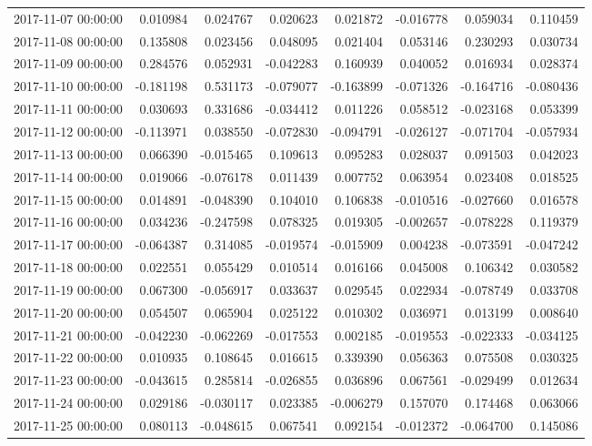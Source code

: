 \begin{tabular}{lrrrrrrr}
2017-11-07 00:00:00 & 0.010984 & 0.024767 & 0.020623 & 0.021872 & -0.016778 & 0.059034 & 0.110459 \\
2017-11-08 00:00:00 & 0.135808 & 0.023456 & 0.048095 & 0.021404 & 0.053146 & 0.230293 & 0.030734 \\
2017-11-09 00:00:00 & 0.284576 & 0.052931 & -0.042283 & 0.160939 & 0.040052 & 0.016934 & 0.028374 \\
2017-11-10 00:00:00 & -0.181198 & 0.531173 & -0.079077 & -0.163899 & -0.071326 & -0.164716 & -0.080436 \\
2017-11-11 00:00:00 & 0.030693 & 0.331686 & -0.034412 & 0.011226 & 0.058512 & -0.023168 & 0.053399 \\
2017-11-12 00:00:00 & -0.113971 & 0.038550 & -0.072830 & -0.094791 & -0.026127 & -0.071704 & -0.057934 \\
2017-11-13 00:00:00 & 0.066390 & -0.015465 & 0.109613 & 0.095283 & 0.028037 & 0.091503 & 0.042023 \\
2017-11-14 00:00:00 & 0.019066 & -0.076178 & 0.011439 & 0.007752 & 0.063954 & 0.023408 & 0.018525 \\
2017-11-15 00:00:00 & 0.014891 & -0.048390 & 0.104010 & 0.106838 & -0.010516 & -0.027660 & 0.016578 \\
2017-11-16 00:00:00 & 0.034236 & -0.247598 & 0.078325 & 0.019305 & -0.002657 & -0.078228 & 0.119379 \\
2017-11-17 00:00:00 & -0.064387 & 0.314085 & -0.019574 & -0.015909 & 0.004238 & -0.073591 & -0.047242 \\
2017-11-18 00:00:00 & 0.022551 & 0.055429 & 0.010514 & 0.016166 & 0.045008 & 0.106342 & 0.030582 \\
2017-11-19 00:00:00 & 0.067300 & -0.056917 & 0.033637 & 0.029545 & 0.022934 & -0.078749 & 0.033708 \\
2017-11-20 00:00:00 & 0.054507 & 0.065904 & 0.025122 & 0.010302 & 0.036971 & 0.013199 & 0.008640 \\
2017-11-21 00:00:00 & -0.042230 & -0.062269 & -0.017553 & 0.002185 & -0.019553 & -0.022333 & -0.034125 \\
2017-11-22 00:00:00 & 0.010935 & 0.108645 & 0.016615 & 0.339390 & 0.056363 & 0.075508 & 0.030325 \\
2017-11-23 00:00:00 & -0.043615 & 0.285814 & -0.026855 & 0.036896 & 0.067561 & -0.029499 & 0.012634 \\
2017-11-24 00:00:00 & 0.029186 & -0.030117 & 0.023385 & -0.006279 & 0.157070 & 0.174468 & 0.063066 \\
2017-11-25 00:00:00 & 0.080113 & -0.048615 & 0.067541 & 0.092154 & -0.012372 & -0.064700 & 0.145086 \\

\end{tabular}
